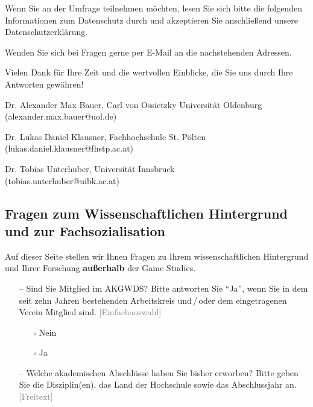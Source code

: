 \documentclass{scrartcl}
\begin{document}
Wenn Sie an der Umfrage teilnehmen möchten, lesen Sie sich bitte die folgenden Informationen zum Datenschutz durch und akzeptieren Sie anschließend unsere Datenschutzerklärung.

Wenden Sie sich bei Fragen gerne per E-Mail an die nachstehenden Adressen.

Vielen Dank für Ihre Zeit und die wertvollen Einblicke, die Sie uns durch Ihre Antworten gewähren!

\vspace{1em}
\noindent Dr. Alexander Max Bauer, Carl von Ossietzky Universität Oldenburg\\
(alexander.max.bauer@uol.de)

\vspace{1em}
\noindent Dr. Lukas Daniel Klausner, Fachhochschule St. Pölten\\
(lukas.daniel.klausner@fhstp.ac.at)

\vspace{1em}
\noindent Dr. Tobias Unterhuber, Universität Innsbruck\\
(tobias.unterhuber@uibk.ac.at)


\subsection*{Fragen zum Wissenschaftlichen Hintergrund und zur Fachsozialisation}
Auf dieser Seite stellen wir Ihnen Fragen zu Ihrem wissenschaftlichen Hintergrund und Ihrer Forschung \textbf{außerhalb} der Game Studies.

\begin{itemize}
   \item[--] Sind Sie Mitglied im AKGWDS? Bitte antworten Sie \enquote{Ja}, wenn Sie in dem seit zehn Jahren bestehenden Arbeitskreis und\,/\,oder dem eingetragenen Verein Mitglied sind. \textcolor{gray}{\textsf{[Einfachauswahl]}}
   \begin{itemize}
      \item[$\square$] Nein
      \item[$\square$] Ja
   \end{itemize}
   \item[--] Welche akademischen Abschlüsse haben Sie bisher erworben? Bitte geben Sie die Disziplin(en), das Land der Hochschule sowie das Abschlussjahr an. \textcolor{gray}{\textsf{[Freitext]}}
\end{itemize}
\end{document}
